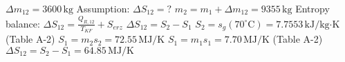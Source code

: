 \( \Delta m_{12} = 3600 \, \text{kg} \)  
Assumption: \( \Delta S_{12} = ? \)  
\( m_2 = m_1 + \Delta m_{12} = 9355 \, \text{kg} \)  
Entropy balance: \( \Delta S_{12} = \frac{Q_{R,12}}{T_{KF}} + S_{erz} \)  
\( \Delta S_{12} = S_2 - S_1 \)  
\( S_2 = s_g(70^\circ \text{C}) = 7.7553 \, \text{kJ/kg·K} \) (Table A-2)  
\( S_1 = m_2 s_2 = 72.55 \, \text{MJ/K} \)  
\( S_1 = m_1 s_1 = 7.70 \, \text{MJ/K} \) (Table A-2)  
\( \Delta S_{12} = S_2 - S_1 = 64.85 \, \text{MJ/K} \)